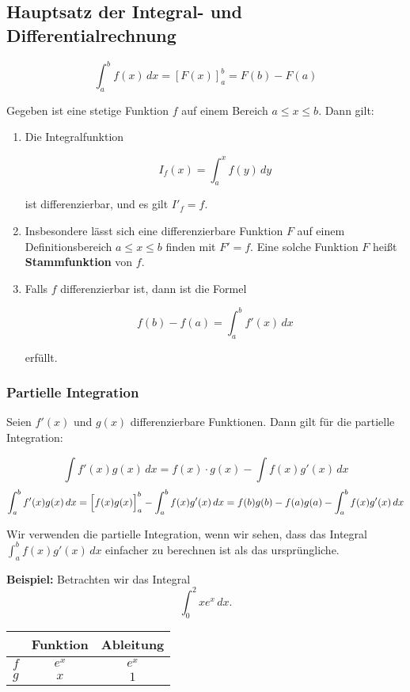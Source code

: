 \documentclass[11pt, openany]{book}
\begin{document}
\subsection{Hauptsatz der Integral- und Differentialrechnung}
\begin{tcolorbox}
\[
\int_{a}^{b} f(x) \,dx = \left[F(x)\right]_{a}^{b} = F(b) - F(a)
\]   
\end{tcolorbox}

Gegeben ist eine stetige Funktion $f$ auf einem Bereich $a \leq x \leq b$. Dann gilt:

\begin{enumerate}
\item Die Integralfunktion

\[ I_f(x) = \int_a^x f(y) \, dy \]

ist differenzierbar, und es gilt $I'_f = f$.

\item Insbesondere lässt sich eine differenzierbare Funktion $F$ auf einem Definitionsbereich $a \leq x \leq b$ finden mit $F' = f$. Eine solche Funktion $F$ heißt \textbf{Stammfunktion} von $f$.

\item Falls $f$ differenzierbar ist, dann ist die Formel

\[ f(b) - f(a) = \int_a^b f'(x) \,dx \]

erfüllt.
\end{enumerate}

\subsubsection{Partielle Integration}
Seien $f'(x)$ und $g(x)$ differenzierbare Funktionen. Dann gilt für die partielle Integration:
\begin{tcolorbox}
 \[\int f'(x)g(x) \,dx  = f(x) \cdot g(x) - \int f(x)g'(x) \, dx\]   
\[\int_a^b f'(x)g(x) \,dx  = \Bigl[f(x)g(x)\Bigr]_a^b - \int_a^b f(x)g'(x) \, dx = f(b)g(b) - f(a)g(a) - \int_a^b f(x)g'(x) \, dx
\] 
\end{tcolorbox}

Wir verwenden die partielle Integration, wenn wir sehen, dass das Integral $\int_a^b f(x)g'(x) \, dx$ einfacher zu berechnen ist als das ursprüngliche.\


\textbf{Beispiel:}
Betrachten wir das Integral
\[
\int_0^2 xe^x \, dx.
\]
\begin{center}
\begin{tabular}{c|c|c}
 & Funktion & Ableitung \\
\hline
$f$ & $e^x$ & $e^x$ \\
\hline
$g$ & $x$ & $1$ \\
\end{tabular} \\    
\end{center}
\end{document}
